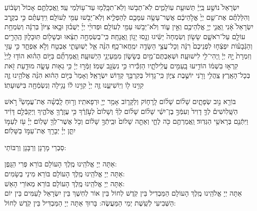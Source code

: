 \documentclass[twoside, openany, parskip=half, 11pt]{book}
\begin{document}
יִשְׂרָאֵל֙ נוֹשַׁ֣ע בַּֽיְיָ֔ תְּשׁוּעַ֖ת עֽוֹלָמִ֑ים לֹֽא־תֵב֥שׁוּ וְלֹֽא־תִכָּֽלְֿמ֖וּ עַד־ע֥וֹלְמֵי עַֽד׃
וַֽאֲכַלְתֶּ֤ם אָכוֹל֙ וְשָׂב֔וֹעַ וְהִלַּלְתֶּ֗ם אֶת־שֵׁ֤ם יְיָ֙ אֱלֹ֣הֵיכֶ֔ם אֲשֶׁר־עָשָׂ֥ה עִמָּכֶ֖ם לְהַפְלִ֑יא וְלֹֽא־יֵבֹ֥שׁוּ עַמִּ֖י לְעוֹלָֽם׃ וִֽידַעְתֶּ֗ם כִּ֣י בְקֶ֤רֶב יִשְׂרָאֵל֙ אָ֔נִי וַֽאֲנִ֛י יְיָ֥ אֱלֹֽהֵיכֶ֖ם וְאֵ֣ין ע֑וֹד וְלֹא־יֵב֥שׁוּ עַמִּ֖י לְעוֹלָֽם׃
וּפְדוּיֵ֨י יְיָ֜ יְשֻׁב֗וּן וּבָ֤אוּ צִיּוֹן֙ בְּרִנָּ֔ה וְשִׂמְחַ֥ת עוֹלָ֖ם עַל־רֹאשָׁ֑ם שָׂשׂ֤וֹן וְשִׂמְחָה֙ יַשִּׂ֔יגוּ וְנָ֖סוּ יָג֥וֹן וַֽאֲנָחָֽה׃ כִּֽי־בְשִׂמְחָ֣ה תֵצֵ֔אוּ וּבְשָׁל֖וֹם תּֽוּבָל֑וּן הֶֽהָרִ֣ים וְהַגְּֿבָע֗וֹת יִפְצְֿח֤וּ לִפְנֵיכֶם֙ רִנָּ֔ה וְכָל־עֲצֵ֥י הַשָּׂדֶ֖ה יִמְֽחֲאוּ־כָֽף׃ הִנֵּ֨ה אֵ֧ל יְשֽׁוּעָתִ֛י אֶבְטַ֖ח וְלֹ֣א אֶפְחָ֑ד כִּ֣י עָזִּ֤י וְזִמְרָת֙ יָ֣הּ יְיָ֔ וַֽיְהִי־לִ֖י לִישׁוּעָֽה׃ וּשְׁאַבְתֶּם־מַ֖יִם בְּשָׂשׂ֑וֹן מִמַּֽעַיְנֵ֖י הַיְשׁוּעָֽה׃ וַֽאֲמַרְתֶּ֞ם בַּיּ֣וֹם הַה֗וּא הוֹד֤וּ לַֽיְיָ֙ קִרְא֣וּ בִשְׁמ֔וֹ הוֹדִ֥יעוּ בָֽעַמִּ֖ים עֲלִֽילֹתָ֑יו הַזְכִּ֕ירוּ כִּ֥י נִשְׂגָּ֖ב שְׁמֽוֹ׃ זַמְּֿר֣וּ יְיָ֔ כִּ֥י גֵא֖וּת עָשָׂ֑ה מוּדַ֥עַת זֹ֖את בְּכָל־הָאָֽרֶץ׃ צַֽהֲלִ֥י וָרֹ֖נִּי יוֹשֶׁ֣בֶת צִיּ֑וֹן כִּֽי־גָד֥וֹל בְּקִרְבֵּ֖ךְ קְד֥וֹשׁ יִשְׂרָאֵֽל׃ וְאָמַר֙ בַּיּ֣וֹם הַה֔וּא הִנֵּ֨ה אֱלֹהֵ֥ינוּ זֶ֛ה קִוִּ֥ינוּ ל֖וֹ וְיֽוֹשִׁיעֵ֑נוּ זֶ֤ה יְיָ֙ קִוִּ֣ינוּ ל֔וֹ נָגִ֥ילָה וְנִשְׂמְֿחָ֖ה בִּישֽׁוּעָתֽוֹ׃


בּוֹרֵ֖א נִ֣וב שְׂפָתָ֑יִם שָׁל֨וֹם שָׁל֜וֹם לָֽרָח֧וֹק וְלַקָּר֛וֹב אָמַ֥ר יְיָ֖ וּרְפָאתִֽיו׃ וְר֣וּחַ לָֽבְֿשָׁ֗ה אֶת־עֲמָשַׂי֘ רֹ֣אשׁ הַשָּֽׁלִושִׁים֒ לְךָ֤ דָוִיד֙ וְעִמְּֿךָ֣ בֶן־יִשַׁ֔י שָׁל֨וֹם שָׁל֜וֹם לְךָ֗ וְשָׁלוֹם֙ לְעֹ֣זְֿרֶ֔ךָ כִּ֥י עֲזָֽרְֿךָ֖ אֱלֹהֶ֑יךָ וַיְקַבְּֿלֵ֣ם דָּוִ֔יד וַיִּתְּֿנֵ֖ם בְּרָאשֵׁ֥י הַגְּדֽוּד׃
 וַֽאֲמַרְתֶּ֥ם כֹּ֖ה לֶחָ֑י וְאַתָּ֤ה שָׁלוֹם֙ וּבֵֽיתְֿךָ֣ שָׁל֔וֹם וְכֹ֥ל אֲשֶׁר־לְךָ֖ שָׁלֽוֹם׃ יְיָ֗ עֹ֖ז לְעַמּ֣וֹ יִתֵּ֑ן יְיָ֓ יְבָרֵ֖ךְ אֶת־עַמּ֣וֹ בַשָּׁלֽוֹם׃

\nextpage


\begin{scriptsize}
סַבְרֵי מָרָנָן וְרַבָּנָן וְרַבּוֹתַי: \\
\end{scriptsize}
  אַתָּה יְיָ אֱלֹהֵֽינוּ מֶֽלֶךְ הָעוֹלָם בּוֹרֵא פְּרִי הַגָּֽפֶן: \\
   אַתָּה יְיָ אֱלֹהֵֽינוּ מֶֽלֶךְ הָעוֹלָם 
בּוֹרֵא מִינֵי בְשָׂמִים: \\
   אַתָּה יְיָ אֱלֹהֵֽינוּ מֶֽלֶךְ הָעוֹלָם בּוֹרֵא מְאוֹרֵי הָאֵשׁ:\\
  אַתָּה יְיָ אֱלֹהֵֽינוּ מֶֽלֶךְ הָעוֹלָם הַמַּבְדִיל בֵּין קֹֽדֶשׁ לְחוֹל בֵּין אוֹר לְחֽשֶׁךְ בֵּין יִשְׂרָאֵל לָעַמִּים בֵּין יוֹם הַשְּׁבִיעִי לְשֵֽׁשֶׁת יְמֵי הַמַּעֲשֶׂה: בָּרוּךְ אַתָּה יְיָ הַמַּבְדִּיל בֵּין קֹֽדֶשׁ לְחוֹל: 
    
\end{document}
